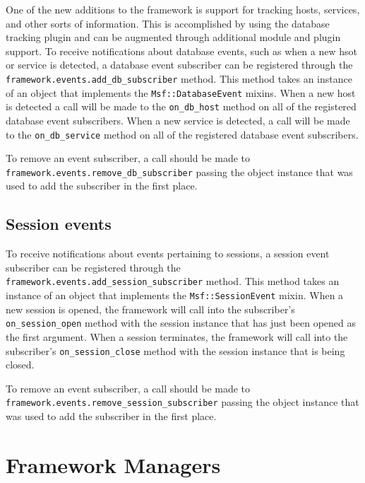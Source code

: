 \documentclass{report}
\begin{document}
\par
One of the new additions to the framework is support for tracking hosts,
services, and other sorts of information.  This is accomplished by using the
database tracking plugin and can be augmented through additional module and
plugin support.  To receive notifications about database events, such as when
a new hsot or service is detected, a database event subscriber can be
registered through the \texttt{framework.events.add\_db\_subscriber} method.
This method takes an instance of an object that implements the
\texttt{Msf::DatabaseEvent} mixins.  When a new host is detected a call will
be made to the \texttt{on\_db\_host} method on all of the registered database
event subscribers.  When a new service is detected, a call will be made to the
\texttt{on\_db\_service} method on all of the registered database event
subscribers.

\par
To remove an event subscriber, a call should be made to\\
\texttt{framework.events.remove\_db\_subscriber} passing the
object instance that was used to add the subscriber in the first
place.

        \subsection{Session events}

\par
To receive notifications about events pertaining to sessions, a
session event subscriber can be registered through the
\texttt{framework.events.add\_session\_subscriber} method.  This
method takes an instance of an object that implements the
\texttt{Msf::SessionEvent} mixin.  When a new session is opened, the
framework will call into the subscriber's \texttt{on\_session\_open}
method with the session instance that has just been opened as the
first argument.  When a session terminates, the framework will call
into the subscriber's \texttt{on\_session\_close} method with the
session instance that is being closed.

\par
To remove an event subscriber, a call should be made to\\
\texttt{framework.events.remove\_session\_subscriber} passing the
object instance that was used to add the subscriber in the first
place.

    \section{Framework Managers}
\end{document}
